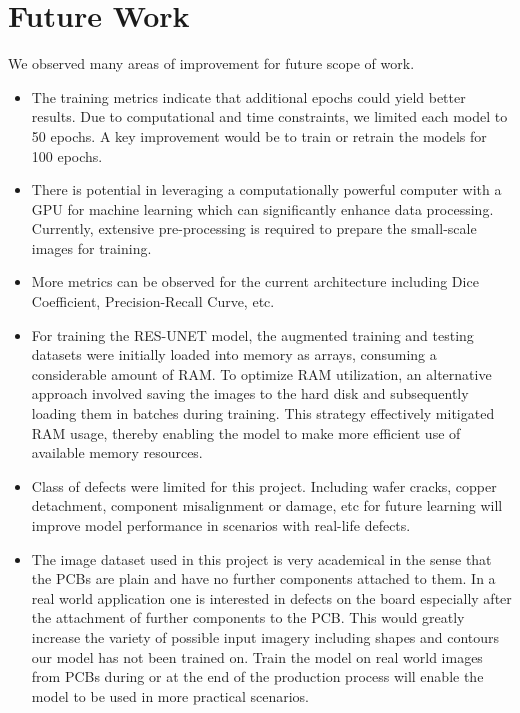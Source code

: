 \documentclass[12pt]{article}
\begin{document}
\clearpage
\newpage

\section{Future Work}
We observed many areas of improvement for future scope of work. 
\begin{itemize}
    \item The training metrics indicate that additional epochs could yield better results. Due to computational and time constraints, we limited each model to 50 epochs. A key improvement would be to train or retrain the models for 100 epochs.
    \item There is potential in leveraging a computationally powerful computer with a GPU for machine learning which can significantly enhance data processing. Currently, extensive pre-processing is required to prepare the small-scale images for training.
    \item More metrics can be observed for the current architecture including Dice Coefficient, Precision-Recall Curve, etc.  
    \item For training the RES-UNET model, the augmented training and testing datasets were initially loaded into memory as arrays, consuming a considerable amount of RAM. To optimize RAM utilization, an alternative approach involved saving the images to the hard disk and subsequently loading them in batches during training. This strategy effectively mitigated RAM usage, thereby enabling the model to make more efficient use of available memory resources.
    \item Class of defects were limited for this project. Including wafer cracks, copper detachment, component misalignment or damage, etc for future learning will improve model performance in scenarios with real-life defects.
    \item The image dataset used in this project is very academical in the sense that the PCBs are plain and have no further components attached to them. In a real world application one is interested in defects on the board especially after the attachment of further components to the PCB. This would greatly increase the variety of possible input imagery including shapes and contours our model has not been trained on. Train the model on real world images from PCBs during or at the end of the production process will enable the model to be used in more practical scenarios.

\end{itemize}
\clearpage
\newpage
\end{document}
